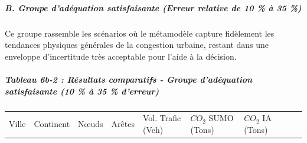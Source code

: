 \documentclass[10pt, a4paper]{article}
\newcounter{none}
\begin{document}
\subparagraph{B. Groupe d'adéquation satisfaisante (Erreur relative de
10 \% à 35
\%)}\label{b.-groupe-daduxe9quation-satisfaisante-erreur-relative-de-10-uxe0-35}

Ce groupe rassemble les scénarios où le métamodèle capture fidèlement
les tendances physiques générales de la congestion urbaine, restant dans
une enveloppe d'incertitude très acceptable pour l'aide à la décision.

\subparagraph{Tableau 6b-2 : Résultats comparatifs - Groupe d'adéquation
satisfaisante (10 \% à 35 \%
d'erreur)}\label{tableau-6b-2-ruxe9sultats-comparatifs---groupe-daduxe9quation-satisfaisante-10-uxe0-35-derreur}

{\def\LTcaptype{none} %
\begin{longtable}[]{@{}
  >{\raggedright\arraybackslash}p{}
  >{\centering\arraybackslash}p{}
  >{\centering\arraybackslash}p{}
  >{\centering\arraybackslash}p{}
  >{\centering\arraybackslash}p{}
  >{\centering\arraybackslash}p{}
  >{\centering\arraybackslash}p{}
  >{\centering\arraybackslash}p{}
  >{\centering\arraybackslash}p{}@{}}
\toprule\noalign{}
\begin{minipage}[b]{\linewidth}\raggedright
Ville
\end{minipage} & \begin{minipage}[b]{\linewidth}\centering
Continent
\end{minipage} & \begin{minipage}[b]{\linewidth}\centering
Nœuds
\end{minipage} & \begin{minipage}[b]{\linewidth}\centering
Arêtes
\end{minipage} & \begin{minipage}[b]{\linewidth}\centering
Vol. Trafic (Veh)
\end{minipage} & \begin{minipage}[b]{\linewidth}\centering
\(CO_2\) SUMO (Tons)
\end{minipage} & \begin{minipage}[b]{\linewidth}\centering
\(CO_2\) IA (Tons)
\end{minipage} & \begin{minipage}[b]{\linewidth}\centering

\end{minipage}
\end{longtable}}
\end{document}
